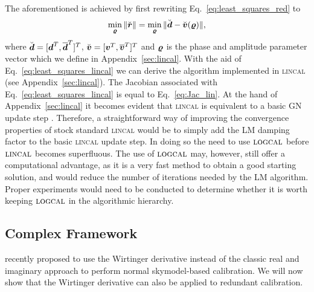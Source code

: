 \documentclass[useAMS,usenatbib]{mn2e}
\newcommand{\bz}{\bmath{z}}
\newcommand{\br}{\bmath{r}}
\newcommand{\bg}{\bmath{g}}
\newcommand{\bd}{\bmath{d}}
\newcommand{\bv}{\bmath{v}}
\newcommand{\by}{\bmath{y}}
\newcommand{\conj}[1]{\overline{#1}}
\begin{document}
The aforementioned is achieved by first rewriting Eq.~\eqref{eq:least_squares_red} to
\begin{equation}
\label{eq:least_squares_lincal}
\min_{\bmath{\varrho}} \|\breve{\br}\| = \min_{\bmath{\varrho}} \|\breve{\bd} - \breve{\bv}(\bmath{\varrho})\|, 
\end{equation}
where $\breve{\bd} = [\bd^T,\conj{\bd}^T]^T$, $\breve{\bv} = [\bv^T,\conj{\bv}^T]^T$ and $\bmath{\varrho}$ is the phase and amplitude parameter vector which we define in Appendix~\ref{sec:lincal}. 
With the aid of Eq.~\eqref{eq:least_squares_lincal} we can derive the algorithm implemented in \textsc{lincal} (see Appendix~\ref{sec:lincal}).
The Jacobian associated with Eq.~\eqref{eq:least_squares_lincal} is equal to Eq.~\eqref{eq:Jac_lin}. 
At the hand of Appendix~\ref{sec:lincal} it becomes evident that \textsc{lincal} is equivalent to a basic GN update step \citep{Kurien2016}. 
Therefore, a straightforward way of improving the convergence properties of stock standard \textsc{lincal} would be to simply add the LM damping factor to the basic \textsc{lincal} update step.
In doing so the need to use $\textsc{logcal}$ before $\textsc{lincal}$ becomes superfluous. The use of $\textsc{logcal}$ may, however, still offer 
a computational advantage, as it is a very fast method to obtain a good starting solution, and would reduce the number of iterations needed by the LM algorithm.
Proper experiments would need to be conducted to determine whether it is worth keeping $\textsc{logcal}$ in the algorithmic hierarchy. 

\subsection{Complex Framework}
\label{sec:w}

\citet{Smirnov2015} recently proposed to use the Wirtinger derivative instead of the classic real and imaginary approach to perform normal skymodel-based calibration. We will now show
that the Wirtinger derivative can also be applied to redundant calibration.

\end{document}
